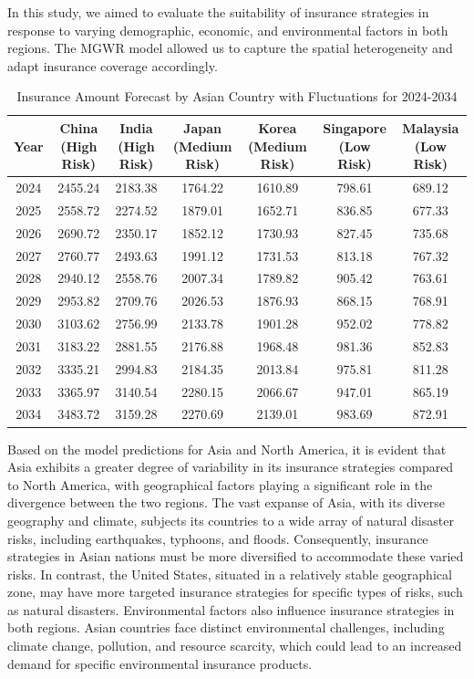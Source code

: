 \documentclass[12pt]{article}
\begin{document}
In this study, we aimed to evaluate the suitability of insurance strategies in response to varying demographic, economic, and environmental factors in both regions. The MGWR model allowed us to capture the spatial heterogeneity and adapt insurance coverage accordingly.
\begin{table}[htbp]
\centering
\caption{Insurance Amount Forecast by Asian Country with Fluctuations for 2024-2034}
\fontsize{8}{9}\selectfont
\begin{tabular}{@{}ccccccc@{}}
\toprule[1.2pt]
Year & China (High Risk) & India (High Risk) & Japan (Medium Risk) & Korea (Medium Risk) & Singapore (Low Risk) & Malaysia (Low Risk) \\
\midrule
2024 & 2455.24 & 2183.38 & 1764.22 & 1610.89 & 798.61 & 689.12 \\
2025 & 2558.72 & 2274.52 & 1879.01 & 1652.71 & 836.85 & 677.33 \\
2026 & 2690.72 & 2350.17 & 1852.12 & 1730.93 & 827.45 & 735.68 \\
2027 & 2760.77 & 2493.63 & 1991.12 & 1731.53 & 813.18 & 767.32 \\
2028 & 2940.12 & 2558.76 & 2007.34 & 1789.82 & 905.42 & 763.61 \\
2029 & 2953.82 & 2709.76 & 2026.53 & 1876.93 & 868.15 & 768.91 \\
2030 & 3103.62 & 2756.99 & 2133.78 & 1901.28 & 952.02 & 778.82 \\
2031 & 3183.22 & 2881.55 & 2176.88 & 1968.48 & 981.36 & 852.83 \\
2032 & 3335.21 & 2994.83 & 2184.35 & 2013.84 & 975.81 & 811.28 \\
2033 & 3365.97 & 3140.54 & 2280.15 & 2066.67 & 947.01 & 865.19 \\
2034 & 3483.72 & 3159.28 & 2270.69 & 2139.01 & 983.69 & 872.91 \\
\bottomrule[1.2pt]
\end{tabular}
\label{asd}
\end{table}

Based on the model predictions for Asia and North America, it is evident that Asia exhibits a greater degree of variability in its insurance strategies compared to North America, with geographical factors playing a significant role in the divergence between the two regions. The vast expanse of Asia, with its diverse geography and climate, subjects its countries to a wide array of natural disaster risks, including earthquakes, typhoons, and floods. Consequently, insurance strategies in Asian nations must be more diversified to accommodate these varied risks. In contrast, the United States, situated in a relatively stable geographical zone, may have more targeted insurance strategies for specific types of risks, such as natural disasters. Environmental factors also influence insurance strategies in both regions. Asian countries face distinct environmental challenges, including climate change, pollution, and resource scarcity, which could lead to an increased demand for specific environmental insurance products.
\end{document}
